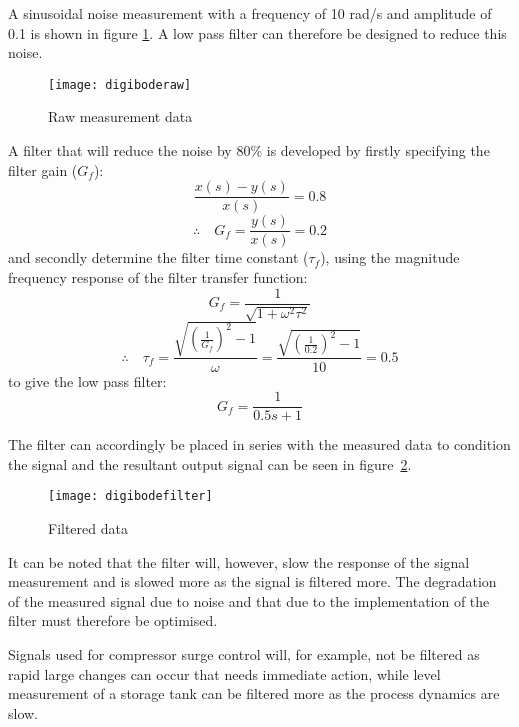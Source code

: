 \begin{example}
	A sinusoidal noise measurement with a frequency of 10 rad/s and amplitude of 0.1 is shown in figure 						\ref{fig:digi:boderaw}. A low pass filter can therefore be designed to reduce this noise.
	\begin{figure}[htbp]
		\centering
		\texttt{[image: digiboderaw]}
		\caption{Raw measurement data}
		\label{fig:digi:boderaw}
	\end{figure}
	
	A filter that will reduce the noise by 80\% is developed by firstly specifying the filter gain ($G_f$): 
	\[ \frac{x(s) - y(s)}{x(s)} = 0.8 \]
	\[\therefore \quad G_f = \frac{y(s)}{x(s)} = 0.2\]
	and secondly determine the filter time constant ($\tau_f$), using the magnitude frequency response of the filter transfer function:
	\[G_f = \frac{1}{\sqrt{1 + \omega^2 \tau^2}}\]
	\[\therefore \quad \tau_f = \frac{\sqrt{(\frac{1}{G_f})^2 - 1}}{\omega} = \frac{\sqrt{(\frac{1}{0.2})^2 - 				1}}{10} = 0.5 \]
	to give the low pass filter:
		\[G_{f} = \frac{1}{0.5s + 1} \]
	
	The filter can accordingly be placed in series with the measured data to condition the signal and the 					resultant output signal can be seen in figure~\ref{fig:digi:bodefilter}. 
	\begin{figure}[htbp]
		\centering
		\texttt{[image: digibodefilter]}
		\caption{Filtered data}
		\label{fig:digi:bodefilter}
	\end{figure}
	It can be noted that the filter will, however, slow the response of the signal measurement and is slowed more 	as the signal is filtered more. The degradation of the measured signal due to noise and that due to the 				implementation 	of the filter must therefore be optimised. 
	
	Signals used for compressor surge control will, for example, not be filtered as rapid large changes can occur 	that needs immediate action, while level measurement of a storage tank can be filtered more as the process 			dynamics are slow.
\end{example}   

